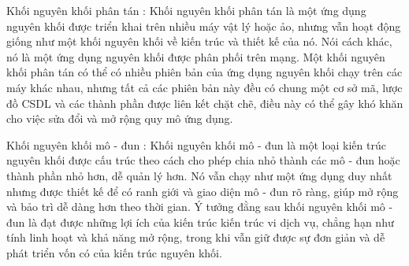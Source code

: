 Khối nguyên khối phân tán : Khối nguyên khối phân tán là một ứng dụng nguyên khối được triển khai trên nhiều máy vật lý hoặc ảo, nhưng vẫn hoạt động giống như một khối nguyên khối về kiến trúc và thiết kế của nó. Nói cách khác, nó là một ứng dụng nguyên khối được phân phối trên mạng. Một khối nguyên khối phân tán có thể có nhiều phiên bản của ứng dụng nguyên khối chạy trên các máy khác nhau, nhưng tất cả các phiên bản này đều có chung một cơ sở mã, lược đồ CSDL và các thành phần được liên kết chặt chẽ, điều này có thể gây khó khăn cho việc sửa đổi và mở rộng quy mô ứng dụng.

Khối nguyên khối mô - đun : Khối nguyên khối mô - đun là một loại kiến trúc nguyên khối được cấu trúc theo cách cho phép chia nhỏ thành các mô - đun hoặc thành phần nhỏ hơn, dễ quản lý hơn. Nó vẫn chạy như một ứng dụng duy nhất nhưng được thiết kế để có ranh giới và giao diện mô - đun rõ ràng, giúp mở rộng và bảo trì dễ dàng hơn theo thời gian. Ý tưởng đằng sau khối nguyên khối mô - đun là đạt được những lợi ích của kiến trúc kiến trúc vi dịch vụ, chẳng hạn như tính linh hoạt và khả năng mở rộng, trong khi vẫn giữ được sự đơn giản và dễ phát triển vốn có của kiến trúc nguyên khối.

